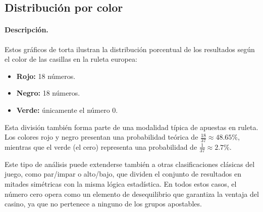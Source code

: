 \documentclass{article}
\begin{document}
\subsection{Distribución por color}
\paragraph{Descripción.}
Estos gráficos de torta ilustran la distribución porcentual de los resultados según el color de las casillas en la ruleta europea:
    \begin{itemize}
        \item \textbf{Rojo:} 18 números.
        \item \textbf{Negro:} 18 números.
        \item \textbf{Verde:} únicamente el número 0. 
    \end{itemize}

Esta división también forma parte de una modalidad típica de apuestas en ruleta. Los colores rojo y negro presentan una probabilidad teórica de $\frac{18}{37} \approx 48.65\%$, mientras que el verde (el cero) representa una probabilidad de $\frac{1}{37} \approx 2.7\%$.

Este tipo de análisis puede extenderse también a otras clasificaciones clásicas del juego, como par/impar o alto/bajo, que dividen el conjunto de resultados en mitades simétricas con la misma lógica estadística. En todos estos casos, el número cero opera como un elemento de desequilibrio que garantiza la ventaja del casino, ya que no pertenece a ninguno de los grupos apostables.
\end{document}
